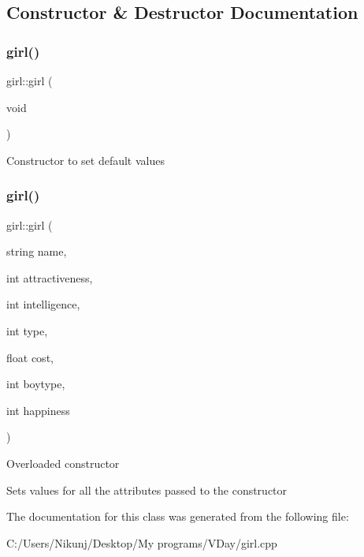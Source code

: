 \subsection{Constructor \& Destructor Documentation}
\mbox{\label{classgirl_a4289c0c8d342d5aaea2f3cf52f75f2c3}} 
\subsubsection{\texorpdfstring{girl()}{girl()}\hspace{0.1cm}{\footnotesize\ttfamily [1/2]}}
{\footnotesize\ttfamily girl\+::girl (\begin{DoxyParamCaption}\item[{void}]{ }\end{DoxyParamCaption})\hspace{0.3cm}{\ttfamily [inline]}}

Constructor to set default values \mbox{\label{classgirl_a17da7a25b35ebb492f61c8dae4b241d6}} 
\subsubsection{\texorpdfstring{girl()}{girl()}\hspace{0.1cm}{\footnotesize\ttfamily [2/2]}}
{\footnotesize\ttfamily girl\+::girl (\begin{DoxyParamCaption}\item[{string}]{name,  }\item[{int}]{attractiveness,  }\item[{int}]{intelligence,  }\item[{int}]{type,  }\item[{float}]{cost,  }\item[{int}]{boytype,  }\item[{int}]{happiness }\end{DoxyParamCaption})\hspace{0.3cm}{\ttfamily [inline]}}

Overloaded constructor

Sets values for all the attributes passed to the constructor 

The documentation for this class was generated from the following file\+:\begin{DoxyCompactItemize}
\item 
C\+:/\+Users/\+Nikunj/\+Desktop/\+My programs/\+V\+Day/girl.\+cpp\end{DoxyCompactItemize}
